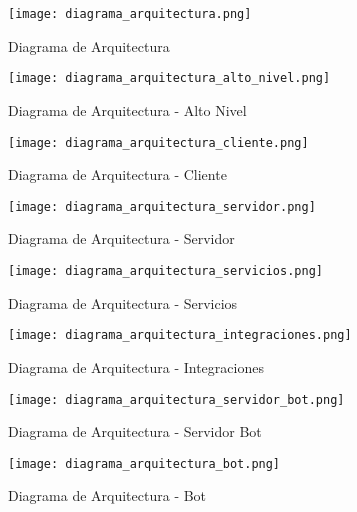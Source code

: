 
\begin{figure}[htbp]
    \centering
    \texttt{[image: diagrama\_arquitectura.png]}
    \caption{Diagrama de Arquitectura}
    \label{fig:diagrama_arquitectura}
\end{figure}

\begin{figure}[htbp]
    \centering
    \texttt{[image: diagrama\_arquitectura\_alto\_nivel.png]}
    \caption{Diagrama de Arquitectura - Alto Nivel}
    \label{fig:diagrama_arquitectura_alto_nivel}
\end{figure}

\begin{figure}[htbp]
    \centering
    \texttt{[image: diagrama\_arquitectura\_cliente.png]}
    \caption{Diagrama de Arquitectura - Cliente}
    \label{fig:diagrama_arquitectura_cliente}
\end{figure}

\begin{figure}[htbp]
    \centering
    \texttt{[image: diagrama\_arquitectura\_servidor.png]}
    \caption{Diagrama de Arquitectura - Servidor}
    \label{fig:diagrama_arquitectura_servidor}
\end{figure}

\begin{figure}[htbp]
    \centering
    \texttt{[image: diagrama\_arquitectura\_servicios.png]}
    \caption{Diagrama de Arquitectura - Servicios}
    \label{fig:diagrama_arquitectura_servicios}
\end{figure}

\begin{figure}[htbp]
    \centering
    \texttt{[image: diagrama\_arquitectura\_integraciones.png]}
    \caption{Diagrama de Arquitectura - Integraciones}
    \label{fig:diagrama_arquitectura_integraciones}
\end{figure}

\begin{figure}[htbp]
    \centering
    \texttt{[image: diagrama\_arquitectura\_servidor\_bot.png]}
    \caption{Diagrama de Arquitectura - Servidor Bot}
    \label{fig:diagrama_arquitectura_servidor_bot}
\end{figure}

\begin{figure}[htbp]
    \centering
    \texttt{[image: diagrama\_arquitectura\_bot.png]}
    \caption{Diagrama de Arquitectura - Bot}
    \label{fig:diagrama_arquitectura_bot}
\end{figure}


